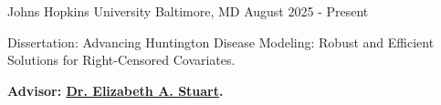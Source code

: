 

\begin{cventries}

  {Johns Hopkins University}
    {Baltimore, MD} %
    {August 2025 - Present} %
    {
    \begin{cvitems} 
        \item Dissertation: Advancing Huntington Disease Modeling: Robust and Efficient Solutions for Right-Censored Covariates.
        \item \textbf{{Advisor: \href{https://www.elizabethstuart.org}{\underline{Dr. Elizabeth A. Stuart}}}.}
      \end{cvitems}
    }

\end{cventries}
